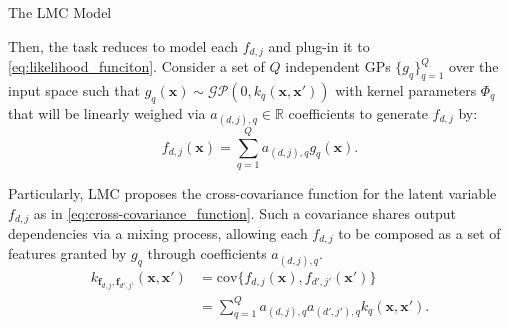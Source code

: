 \begin{frame}{The LMC Model}
	
Then, the task reduces to model each \(f_{d,j}\) and plug-in it to \cref{eq:likelihood_funciton}. Consider a set of \( Q \) independent GPs \( \{ g_q \}_{q=1}^Q \) over the input space such that \( g_q(\boldsymbol{x}) \sim \mathcal{GP}(0, k_q(\boldsymbol{x}, \boldsymbol{x}'))\) with kernel parameters \( \Phi_q \) that will be linearly weighed via \( a_{(d,j),q} \in \mathbb{R} \) coefficients to generate \( f_{d,j} \) by:
\begin{equation}\label{eq:lmc_process}
	f_{d,j}(\boldsymbol{x}) = \sum_{q=1}^Q a_{(d,j),q} g_{q}(\boldsymbol{x}).
\end{equation}

Particularly, LMC proposes the cross-covariance function for the latent variable \( f_{d,j} \) as in \cref{eq:cross-covariance_function}. Such a covariance shares output dependencies via a mixing process, allowing each \( f_{d,j} \) to be composed as a set of features granted by \( g_q \) through coefficients \( a_{(d,j),q} \).
\begin{equation}
	\begin{split}\label{eq:cross-covariance_function}
		k_{\boldsymbol{f}_{d,j}, \boldsymbol{f}_{d',j'}}(\boldsymbol{x}, \boldsymbol{x}') &= \text{cov}\{f_{d,j}(\boldsymbol{x}), f_{d',j'}(\boldsymbol{x}')\}\\
		&=\sum_{q=1}^Q a_{(d,j),q}a_{(d',j'),q} k_{q}(\boldsymbol{x}, \boldsymbol{x}').
	\end{split}
\end{equation}

\end{frame}


